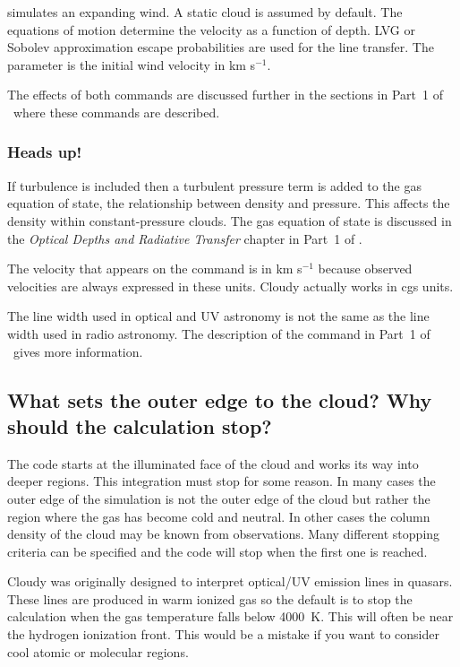 \documentclass[12pt,twoside]{article}
\begin{document}
{ simulates an expanding wind.
A static cloud is assumed by default.
The equations of motion determine the velocity as a function of depth.
LVG or Sobolev approximation escape probabilities are used for the line
transfer.  The parameter is the initial wind velocity in km s$^{-1}$.

The effects of both commands are discussed further in the sections in
Part~1 of \Hazy\ where these commands are described.

\subsubsection{Heads up!}

If turbulence is included then a turbulent pressure term is added to
the gas equation of state, the relationship between density and pressure.
This affects the density within constant-pressure clouds.  The gas equation
of state is discussed in the \emph{Optical Depths and Radiative Transfer}
chapter in Part~1 of \Hazy.

The velocity that appears on the 
command is in km s$^{-1}$ because
observed velocities are always expressed in these units. Cloudy actually
works in cgs units.

The line width used in optical and UV astronomy is not the same as the
line width used in radio astronomy.
The description of the  command in Part~1 of
\Hazy\ gives more information.

\subsection{What sets the outer edge to the cloud?
Why should the calculation stop?}
\label{sec:StoppingCriteria}

The code starts at the illuminated face of the cloud and works its way
into deeper regions.
This integration must stop for some reason.
In many
cases the outer edge of the simulation is not the outer edge of the cloud
but rather the region where the gas has become cold and neutral.  In other
cases the column density of the cloud may be known from observations.  Many
different stopping criteria can be specified and the code will stop when
the first one is reached.

Cloudy was originally designed to interpret optical/UV emission lines
in quasars.  These lines are produced in warm ionized gas so the default
is to stop the calculation when the gas temperature falls below 4000~K.
This will often be near the hydrogen ionization front.  This would be a
mistake if you want to consider cool atomic or molecular regions.

}
\end{document}

